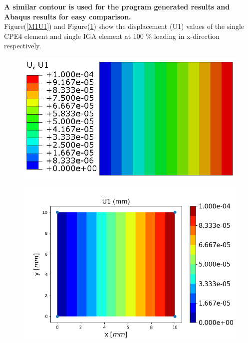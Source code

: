 \documentclass[12pt]{article}
\begin{document}
\textbf{A similar contour is used for the program generated results and Abaqus results for easy comparison. }\\
Figure(\ref{M1U1}) and Figure(\ref{M1U1_IGA}) show the displacement (U1) values of the single CPE4 element and single IGA element at 100 \% loading in x-direction respectively. \\
\begin{figure}[H]
	\centering
	\begin{minipage}{.5\textwidth}
		\centering
		\includegraphics[width=1\linewidth]{M1U1.png}
		\label{M1U1}
	\end{minipage}%
	\begin{minipage}{.55\textwidth}
		\centering
		\includegraphics[width=1\linewidth]{M1U1_IGA.png}
		\label{M1U1_IGA}
	\end{minipage}
\end{figure}
\end{document}
